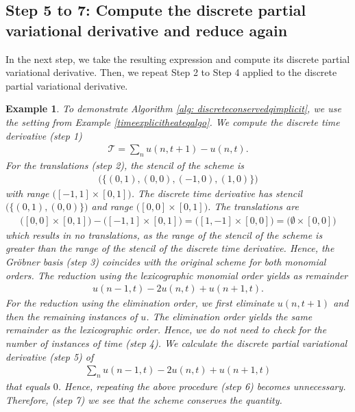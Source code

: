 \documentclass[sigconf,twocolumn]{acmart}
\newcommand{\1}{{\chi}}
\numberwithin{equation}{section}
\theoremstyle{thmlemcorr}
\numberwithin{theorem}{section}
\theoremstyle{thmlemcorr*}
\theoremstyle{defi}
\theoremstyle{remexample}
\newtheorem{example}[theorem]{Example}
\theoremstyle{ass}
\begin{document}
\subsection*{Step 5 to 7: Compute the discrete partial variational derivative and reduce again}
	In the next step, we take the resulting expression and compute its discrete partial variational derivative. Then, we repeat Step 2 to Step 4 applied to the discrete partial variational derivative.
	\begin{example}
		\label{heateqalgoimplicit}
		To demonstrate Algorithm \ref{alg: discreteconservedqimplicit}, we use the setting from Example \ref{timeexplicitheateqalgo}.
		We compute the discrete time derivative (step 1)
		\begin{gather*}
			\mathcal{T}=\sum_n u(n,t+1)-u(n,t).
		\end{gather*}
		For the translations (step 2), the stencil of the scheme is
		\begin{gather*}
			\Big(\big\{(0,1),(0,0),(-1,0),(1,0)\big\}\Big)
		\end{gather*}
	with range $\Big([-1,1]\times[0,1]\Big)$.
	The discrete time derivative has stencil $\Big(\big\{(0,1),(0,0)\big\}\Big)$
	and range $\Big([0,0]\times[0,1]\Big)$.
	The translations are
	\small
	\begin{gather*}
	\Big([0,0]\times[0,1]\Big)-\Big([-1,1]\times[0,1]\Big)=\Big([1,-1]\times[0,0]\Big)=\Big(\emptyset\times[0,0]\Big)
	\end{gather*}
	\normalsize
	which results in no translations, as the range of the stencil of the scheme is greater than the range of the stencil of the discrete time derivative.
	Hence, the Gr{\"o}bner basis (step 3) coincides with the original scheme for both monomial orders.
	The reduction using the lexicographic monomial order yields as remainder
	\begin{gather*}
		u(n-1,t)-2u(n,t)+u(n+1,t).
	\end{gather*}
	For the reduction using the elimination order, we first eliminate $u(n,t+1)$ and then the remaining instances of $u$.
	The elimination order yields the same remainder as the lexicographic order. Hence, we do not need to check for the number of instances of time (step 4).
	We calculate the discrete partial variational derivative (step 5) of
	\begin{gather*}
		\sum_nu(n-1,t)-2u(n,t)+u(n+1,t)
	\end{gather*}
	that equals $0$.
	Hence, repeating the above procedure (step 6) becomes unnecessary.
	Therefore, (step 7) we see that the scheme conserves the quantity.
	\end{example}
\end{document}
